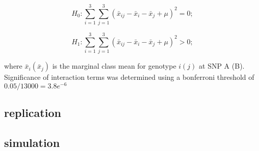 \documentclass[paper=a4, fontsize=11pt]{scrartcl}	%
\numberwithin{equation}{section}									%
\numberwithin{figure}{section}										%
\numberwithin{table}{section}										%
\begin{document}
\begin{equation}
H _0: \sum _{i=1} ^3 \sum _{j=1} ^3 (\bar x _{ij} - \bar x _i - \bar x _j + \mu) ^2 = 0;
\end{equation}

\begin{equation}
H _1: \sum _{i=1} ^3 \sum _{j=1} ^3 (\bar x _{ij} - \bar x _i - \bar x _j + \mu) ^2 > 0;
\label{eq:4df}
\end{equation}

where $\bar x _i (\bar x _j)$ is the marginal class mean for genotype $i (j)$ at SNP A (B). Significance of interaction terms was determined using a bonferroni threshold of $0.05 / 13000 = 3.8e^{-6}$ 


\subsection{replication}  

\subsection{simulation}










\end{document}
